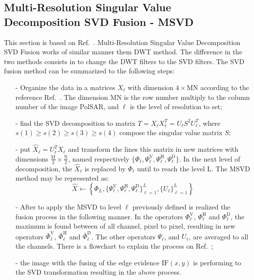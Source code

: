 \documentclass[conference]{IEEEtran}
\begin{document}
\subsection{Multi-Resolution Singular Value Decomposition SVD Fusion - MSVD}
This section is based on Ref.~\cite{naidu}. Multi-Resolution Singular Value Decomposition SVD Fusion works of similar manner them DWT method.  The difference in the two methods consists in to change the DWT filters to the SVD filters. The SVD fusion method can be summarized to the following steps:
\begin{itemize}
\item[-] Organize the data in a matrices $X_\ell$ with dimension $4\times\text{MN}$ according to the reference Ref.~\cite{naidu}. The dimension MN is the row number multiply to the  column number of the image PolSAR, and $\ell$ is the level of resolution to set;  
\item[-] find the SVD decomposition to matrix $T=X_\ell X_\ell^T=U_\ell S^2 U_\ell^T$, where $s(1)\geq s(2) \geq s(3) \geq s(4)$ compose the singular value matrix $S$;
\item[-] put $\widehat{X}_\ell=U_\ell^TX_\ell$ and transform the lines this matrix in new matrices with dimensions $\frac{\text{M}}{2}\times\frac{\text{N}}{2}$, named respectively $\{\Phi_\ell, \Psi_\ell^\text{V}, \Psi_\ell^\text{H}, \Psi_\ell^\text{D}\}$. In the next level of decomposition, the $\widehat{X}_\ell$ is replaced by $\Phi_\ell$ until to reach the level L. The MSVD method may be represented as:
\begin{equation}\label{msvd_iter}
\widehat{X}\leftarrow \left\{\Phi_L,\{\Psi_\ell^\text{V},\Psi_\ell^\text{H},\Psi_\ell^\text{D} \}_{\ell=1}^L,\{U_\ell\}_{\ell=1}^L \right\}
\end{equation}
\item[-] After to apply the MSVD to level $\ell$ previously defined is realized the fusion process in the following manner. In the operators $\Phi_\ell^\text{V}$, $\Phi_\ell^\text{H}$ and $\Phi_\ell^\text{D}$, the maximum is found between of all channel, pixel to pixel, resulting in new operators $\bar{\Phi}_\ell^\text{V}$, $\bar{\Phi}_\ell^\text{H}$ and $\bar{\Phi}_\ell^\text{D}$. The other operators $\Psi_\ell$, and $U_\ell$, are averaged to all the channels. There is a  flowchart to  explain the process on Ref.~\cite{naidu};
\item[-] the image with the fusing of the edge evidence $\text{IF}(x,y)$ is performing to the SVD transformation resulting in the above process. 
\end{itemize}
\end{document}

